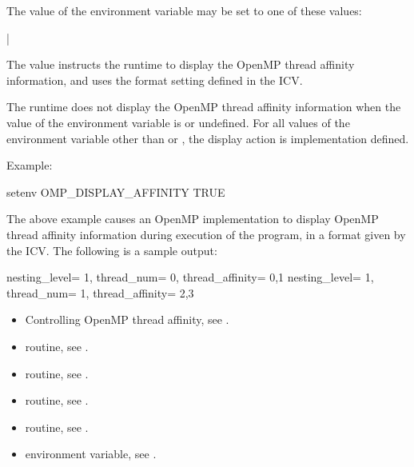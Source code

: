 The value of the  environment variable may be set to one of these
values:

{|}


The  value instructs the runtime to display the OpenMP thread affinity information, and uses the
format setting defined in the  ICV.

The runtime does not display the OpenMP thread affinity information when the value of the 
environment variable is  or undefined. For all values of the environment
variable other than  or , the display action is implementation defined.

Example:
\begin{ompEnv}
setenv OMP_DISPLAY_AFFINITY TRUE
\end{ompEnv}

The above example causes an OpenMP implementation to display OpenMP thread affinity information during execution of
the program, in a format given by the  ICV.  The following is a sample output:
\begin{ompSyntax}
nesting_level=   1,   thread_num=   0,   thread_affinity=    0,1
nesting_level=   1,   thread_num=   1,   thread_affinity=    2,3
\end{ompSyntax}

\crossreferences
\begin{itemize}

\item Controlling OpenMP thread affinity, see
.
\item {} routine, see .
\item {} routine, see .
\item {} routine, see .
\item {} routine, see .
\item {} environment variable, see
.
\end{itemize}


\section{}
\label{sec:OMP_AFFINITY_FORMAT}

